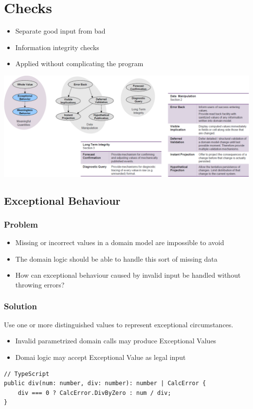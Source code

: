 \section{Checks}
\begin{itemize}
    \item Separate good input from bad
    \item Information integrity checks
    \item Applied without complicating the program
\end{itemize}
\includegraphics[width=\linewidth]{./img/checks_overview.png}

\subsection{Exceptional Behaviour}
\subsubsection{Problem}
\begin{itemize}
    \item Missing or incorrect values in a domain model are impossible to avoid
    \item The domain logic should be able to handle this sort of missing data
    \item How can exceptional behaviour caused by invalid input be handled without throwing errors?
\end{itemize}
\subsubsection{Solution}
Use one or more distinguished values to represent exceptional circumstances.
\begin{itemize}
    \item Invalid parametrized domain calls may produce Exceptional Values
    \item Domai logic may accept Exceptional Value as legal input
\end{itemize}
\begin{lstlisting}
// TypeScript
public div(num: number, div: number): number | CalcError {
    div === 0 ? CalcError.DivByZero : num / div;
}
\end{lstlisting}

